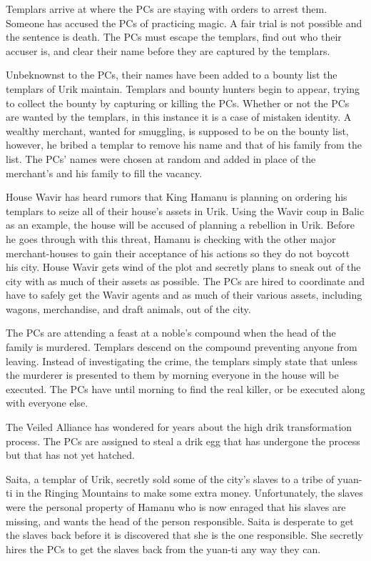 {
	\item Templars arrive at where the PCs are staying with orders to arrest them. Someone has accused the PCs of practicing magic. A fair trial is not possible and the sentence is death. The PCs must escape the templars, find out who their accuser is, and clear their name before they are captured by the templars.
	\item Unbeknownst to the PCs, their names have been added to a bounty list the templars of Urik maintain. Templars and bounty hunters begin to appear, trying to collect the bounty by capturing or killing the PCs. Whether or not the PCs are wanted by the templars, in this instance it is a case of mistaken identity. A wealthy merchant, wanted for smuggling, is supposed to be on the bounty list, however, he bribed a templar to remove his name and that of his family from the list. The PCs' names were chosen at random and added in place of the merchant's and his family to fill the vacancy.
	\item House Wavir has heard rumors that King Hamanu is planning on ordering his templars to seize all of their house's assets in Urik. Using the Wavir coup in Balic as an example, the house will be accused of planning a rebellion in Urik. Before he goes through with this threat, Hamanu is checking with the other major merchant-houses to gain their acceptance of his actions so they do not boycott his city. House Wavir gets wind of the plot and secretly plans to sneak out of the city with as much of their assets as possible. The PCs are hired to coordinate and have to safely get the Wavir agents and as much of their various assets, including wagons, merchandise, and draft animals, out of the city.
	\item The PCs are attending a feast at a noble's compound when the head of the family is murdered. Templars descend on the compound preventing anyone from leaving. Instead of investigating the crime, the templars simply state that unless the murderer is presented to them by morning everyone in the house will be executed. The PCs have until morning to find the real killer, or be executed along with everyone else.
	\item The Veiled Alliance has wondered for years about the high drik transformation process. The PCs are assigned to steal a drik egg that has undergone the process but that has not yet hatched.
	\item Saita, a templar of Urik, secretly sold some of the city's slaves to a tribe of yuan-ti in the Ringing Mountains to make some extra money. Unfortunately, the slaves were the personal property of Hamanu who is now enraged that his slaves are missing, and wants the head of the person responsible. Saita is desperate to get the slaves back before it is discovered that she is the one responsible. She secretly hires the PCs to get the slaves back from the yuan-ti any way they can.
}
